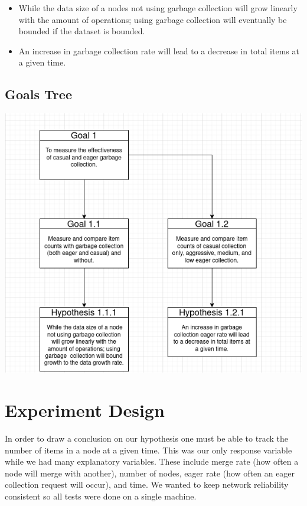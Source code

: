 \documentclass{article}
\begin{document}
\begin{multicols}{2}
\begin{refsection}
\begin{itemize}
    \item While the data size of a nodes not using garbage collection will
          grow linearly with the amount of operations; using garbage collection
          will eventually be bounded if the dataset is bounded.
    \item An increase in garbage collection rate will lead to a decrease in
          total items at a given time.
\end{itemize}

\subsection*{Goals Tree}

\includegraphics[width=\columnwidth]{GoalTree}

\section*{Experiment Design}

In order to draw a conclusion on our hypothesis one must be able to
track the number of items in a node at a given time. This was our only
response variable while we had many explanatory variables. These include
merge rate (how often a node will merge with another), number of nodes,
eager rate (how often an eager collection request will occur), and time.
We wanted to keep network reliability consistent so all tests were done
on a single machine.


\end{refsection}
\end{multicols}
\end{document}

